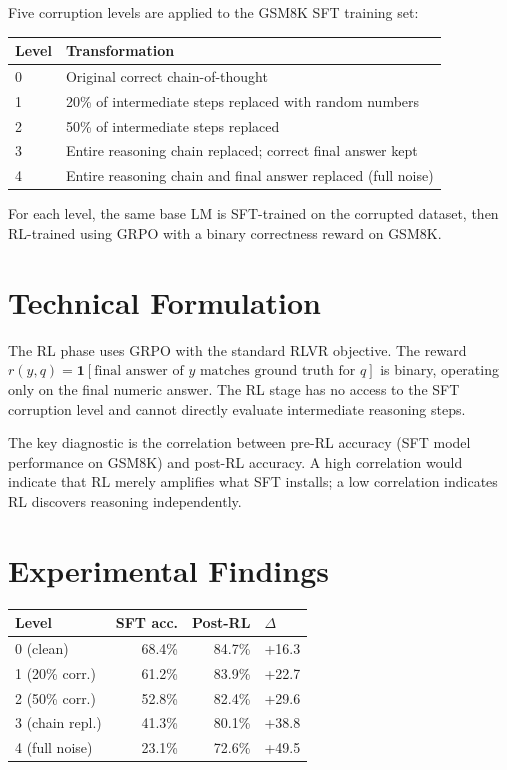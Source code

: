 \documentclass[10pt,twocolumn]{article}
\begin{document}
Five corruption levels are applied to the GSM8K SFT training set:

\begin{center}
\small
\begin{tabular}{lp{5cm}}
\toprule
\textbf{Level} & \textbf{Transformation} \\
\midrule
0 & Original correct chain-of-thought \\
1 & 20\% of intermediate steps replaced with random numbers \\
2 & 50\% of intermediate steps replaced \\
3 & Entire reasoning chain replaced; correct final answer kept \\
4 & Entire reasoning chain and final answer replaced (full noise) \\
\bottomrule
\end{tabular}
\end{center}

For each level, the same base LM is SFT-trained on the corrupted dataset, then RL-trained using GRPO with a binary correctness reward on GSM8K.

\section{Technical Formulation}

The RL phase uses GRPO with the standard RLVR objective.
The reward $r(y, q) = \mathbf{1}[\text{final answer of } y \text{ matches ground truth for } q]$ is binary, operating only on the final numeric answer.
The RL stage has no access to the SFT corruption level and cannot directly evaluate intermediate reasoning steps.

The key diagnostic is the correlation between pre-RL accuracy (SFT model performance on GSM8K) and post-RL accuracy.
A high correlation would indicate that RL merely amplifies what SFT installs; a low correlation indicates RL discovers reasoning independently.

\section{Experimental Findings}

\begin{center}
\small
\begin{tabular}{lrrl}
\toprule
\textbf{Level} & \textbf{SFT acc.} & \textbf{Post-RL} & \textbf{$\Delta$} \\
\midrule
0 (clean) & 68.4\% & 84.7\% & +16.3 \\
1 (20\% corr.) & 61.2\% & 83.9\% & +22.7 \\
2 (50\% corr.) & 52.8\% & 82.4\% & +29.6 \\
3 (chain repl.) & 41.3\% & 80.1\% & +38.8 \\
4 (full noise) & 23.1\% & 72.6\% & +49.5 \\
\bottomrule
\end{tabular}
\end{center}
\end{document}
